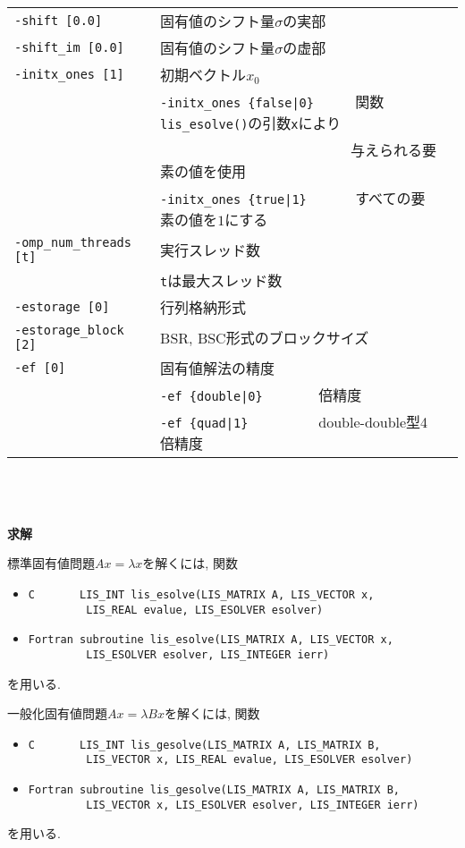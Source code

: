 \documentclass[a4paper]{jarticle}
\begin{document}
{{\begin{minipage}[t]{\textwidth}
\begin{center}
\begin{tabular}{l|ll}
\verb=-shift [0.0]= & 固有値のシフト量$\sigma$の実部 \\
\verb=-shift_im [0.0]= & 固有値のシフト量$\sigma$の虚部 \\
\verb=-initx_ones [1]= & 初期ベクトル$x_{0}$  \\
                       & \verb=-initx_ones {false|0}     =  関数\verb=lis_esolve()=の引数\verb=x=により \\
                       & \verb=                          =  与えられる要素の値を使用 \\
                       & \verb=-initx_ones {true|1}      =  すべての要素の値を$1$にする\\
\verb=-omp_num_threads [t]= & 実行スレッド数         \\ 
                            & \verb=t=は最大スレッド数 \\
\verb=-estorage [0]=   & 行列格納形式 \\
\verb=-estorage_block [2]= & BSR, BSC形式のブロックサイズ \\ 
\verb=-ef [0]=         & 固有値解法の精度 \\
                       & \verb=-ef {double|0}       =   倍精度 \\
                       & \verb=-ef {quad|1}         =   double-double型4倍精度 \\
\hline         
\end{tabular}
\end{center}
\end{minipage}
\\ \\ \\
\noindent
{\bf 求解}

標準固有値問題$Ax=\lambda x$を解くには, 関数
\begin{itemize}
\item \verb|C       LIS_INT lis_esolve(LIS_MATRIX A, LIS_VECTOR x,|\\
      \verb|         LIS_REAL evalue, LIS_ESOLVER esolver)|
\item \verb|Fortran subroutine lis_esolve(LIS_MATRIX A, LIS_VECTOR x,|\\
      \verb|         LIS_ESOLVER esolver, LIS_INTEGER ierr)|
\end{itemize}
を用いる. 

一般化固有値問題$Ax=\lambda Bx$を解くには, 関数
\begin{itemize}
\item \verb|C       LIS_INT lis_gesolve(LIS_MATRIX A, LIS_MATRIX B,|\\
      \verb|         LIS_VECTOR x, LIS_REAL evalue, LIS_ESOLVER esolver)|
\item \verb|Fortran subroutine lis_gesolve(LIS_MATRIX A, LIS_MATRIX B,|\\
      \verb|         LIS_VECTOR x, LIS_ESOLVER esolver, LIS_INTEGER ierr)|
\end{itemize}
を用いる. 

}}
\end{document}
